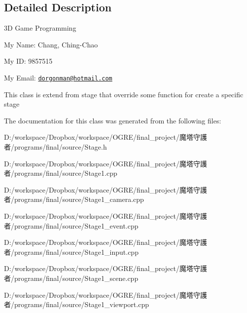 \subsection{Detailed Description}
3D Game Programming\par
 My Name: Chang, Ching-\/Chao\par
 My ID: 9857515\par
 My Email: \href{mailto:dorgonman@hotmail.com}{\tt dorgonman@hotmail.com} 

This class is extend from stage that override some function for create a specific stage 

The documentation for this class was generated from the following files:\begin{DoxyCompactItemize}
\item 
D:/workspace/Dropbox/workspace/OGRE/final\_\-project/魔塔守護者/programs/final/source/Stage.h\item 
D:/workspace/Dropbox/workspace/OGRE/final\_\-project/魔塔守護者/programs/final/source/Stage1.cpp\item 
D:/workspace/Dropbox/workspace/OGRE/final\_\-project/魔塔守護者/programs/final/source/Stage1\_\-camera.cpp\item 
D:/workspace/Dropbox/workspace/OGRE/final\_\-project/魔塔守護者/programs/final/source/Stage1\_\-event.cpp\item 
D:/workspace/Dropbox/workspace/OGRE/final\_\-project/魔塔守護者/programs/final/source/Stage1\_\-input.cpp\item 
D:/workspace/Dropbox/workspace/OGRE/final\_\-project/魔塔守護者/programs/final/source/Stage1\_\-scene.cpp\item 
D:/workspace/Dropbox/workspace/OGRE/final\_\-project/魔塔守護者/programs/final/source/Stage1\_\-viewport.cpp\end{DoxyCompactItemize}
